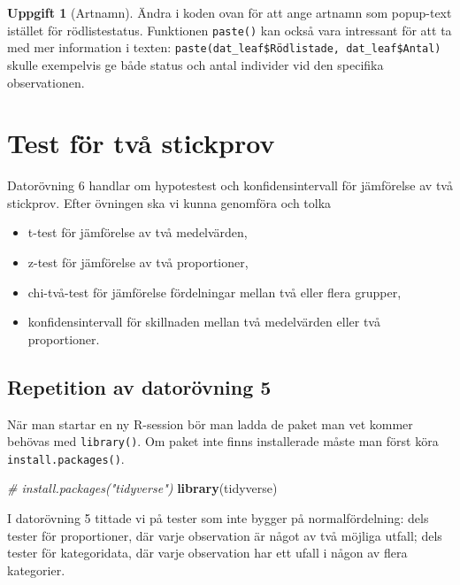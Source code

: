 \documentclass[
]{book}
\newenvironment{Shaded}{\begin{snugshade}}{\end{snugshade}}
\newcommand{\CommentTok}[1]{\textcolor[rgb]{0.56,0.35,0.01}{\textit{#1}}}
\newcommand{\FunctionTok}[1]{\textcolor[rgb]{0.13,0.29,0.53}{\textbf{#1}}}
\newcommand{\NormalTok}[1]{#1}
\theoremstyle{definition}
\theoremstyle{definition}
\theoremstyle{definition}
\newtheorem{exercise}{Uppgift}[chapter]
\theoremstyle{definition}
\theoremstyle{remark}
\begin{document}
\begin{exercise}[Artnamn]
Ändra i koden ovan för att ange artnamn som popup-text istället för rödlistestatus. Funktionen \texttt{paste()} kan också vara intressant för att ta med mer information i texten: \texttt{paste(dat\_leaf\$Rödlistade,\ dat\_leaf\$Antal)} skulle exempelvis ge både status och antal individer vid den specifika observationen.
\end{exercise}

\hypertarget{test-fuxf6r-tvuxe5-stickprov}{%
\chapter{Test för två stickprov}\label{test-fuxf6r-tvuxe5-stickprov}}

Datorövning 6 handlar om hypotestest och konfidensintervall för jämförelse av två stickprov. Efter övningen ska vi kunna genomföra och tolka

\begin{itemize}
\item
  t-test för jämförelse av två medelvärden,
\item
  z-test för jämförelse av två proportioner,
\item
  chi-två-test för jämförelse fördelningar mellan två eller flera grupper,
\item
  konfidensintervall för skillnaden mellan två medelvärden eller två proportioner.
\end{itemize}

\hypertarget{repetition-av-datoruxf6vning-5}{%
\section{Repetition av datorövning 5}\label{repetition-av-datoruxf6vning-5}}

När man startar en ny R-session bör man ladda de paket man vet kommer behövas med \texttt{library()}. Om paket inte finns installerade måste man först köra \texttt{install.packages()}.

\begin{Shaded}
\begin{Highlighting}[]
\CommentTok{\# install.packages("tidyverse")}
\FunctionTok{library}\NormalTok{(tidyverse)}
\end{Highlighting}
\end{Shaded}

I datorövning 5 tittade vi på tester som inte bygger på normalfördelning: dels tester för proportioner, där varje observation är något av två möjliga utfall; dels tester för kategoridata, där varje observation har ett ufall i någon av flera kategorier.
\end{document}

